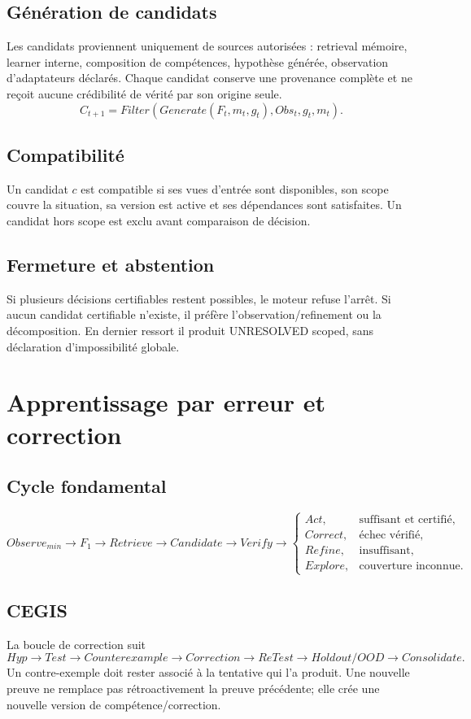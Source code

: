 \documentclass[11pt,a4paper]{report}
\begin{document}
\section{Génération de candidats}
Les candidats proviennent uniquement de sources autorisées : retrieval mémoire, learner interne, composition de compétences, hypothèse générée, observation d'adaptateurs déclarés. Chaque candidat conserve une provenance complète et ne reçoit aucune crédibilité de vérité par son origine seule.
\[
C_{t+1}=Filter(Generate(F_t,m_t,g_t),Obs_t,g_t,m_t).
\]

\section{Compatibilité}
Un candidat $c$ est compatible si ses vues d'entrée sont disponibles, son scope couvre la situation, sa version est active et ses dépendances sont satisfaites. Un candidat hors scope est exclu avant comparaison de décision.

\section{Fermeture et abstention}
Si plusieurs décisions certifiables restent possibles, le moteur refuse l'arrêt. Si aucun candidat certifiable n'existe, il préfère l'observation/refinement ou la décomposition. En dernier ressort il produit UNRESOLVED scoped, sans déclaration d'impossibilité globale.

\chapter{Apprentissage par erreur et correction}
\section{Cycle fondamental}
\[
Observe_{min}\to F_1\to Retrieve\to Candidate\to Verify\to
\begin{cases}
Act,&\text{suffisant et certifié},\\
Correct,&\text{échec vérifié},\\
Refine,&\text{insuffisant},\\
Explore,&\text{couverture inconnue}.
\end{cases}
\]
\section{CEGIS}
La boucle de correction suit
\[
Hyp\to Test\to Counterexample\to Correction\to ReTest\to Holdout/OOD\to Consolidate.
\]
Un contre-exemple doit rester associé à la tentative qui l'a produit. Une nouvelle preuve ne remplace pas rétroactivement la preuve précédente; elle crée une nouvelle version de compétence/correction.
\end{document}
